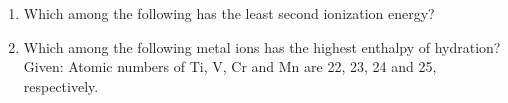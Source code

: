 \documentclass[journal,12pt,onecolumn]{IEEEtran}
\theoremstyle{remark}
\begin{document}
\begin{enumerate}

    \item Which among the following has the least second ionization energy?

    \hfill{}
    \begin{enumerate}
    \end{enumerate}

    \item Which among the following metal ions has the highest enthalpy of hydration?  Given: Atomic numbers of Ti, V, Cr and Mn are 22, 23, 24 and 25, respectively.

    \hfill{}
    \begin{enumerate}
    \end{enumerate}


\end{enumerate}
\end{document}
